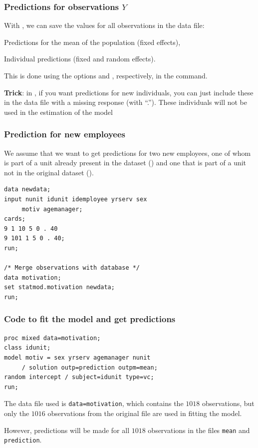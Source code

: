 \documentclass{beamer}
\begin{document}
\begin{frame}[fragile]
\frametitle{Predictions for observations $Y$}
\bi
\item With , we can save the values \alert{for all observations in the data file}:
\bi
\item Predictions for the mean of the population (fixed effects),
\item Individual predictions (fixed and random effects).
\ei
\item This is done using the options 
and , respectively, in the  command.
\item \textbf{Trick}: in \SASlang{}, if you want predictions for new individuals, you can just include these in the data file with a missing response (with ``.''). These individuals will not be used in the estimation of the model
\ei
\end{frame}

\begin{frame}[fragile]
\frametitle{Prediction for new employees}
We assume that we want to get predictions for two new employees, one of whom is part of a unit already present in the dataset () and one that is part of a unit not in the original dataset (). 


\begin{tcolorbox}[colback=white, colframe=hecblue, title=\SASlang{} code to input two new observations]
\begin{small}
\begin{verbatim}
data newdata; 
input nunit idunit idemployee yrserv sex 
     motiv agemanager; 
cards; 
9 1 10 5 0 . 40 
9 101 1 5 0 . 40; 
run; 

/* Merge observations with database */
data motivation; 
set statmod.motivation newdata; 
run;
\end{verbatim}
\end{small}
\end{tcolorbox}
\end{frame}

\begin{frame}[fragile]
\frametitle{Code to fit the model and get predictions}
\begin{tcolorbox}[colback=white, colframe=hecblue, title=\SASlang{} code to output predictions from a mixed model]
\begin{verbatim}
proc mixed data=motivation; 
class idunit; 
model motiv = sex yrserv agemanager nunit 
     / solution outp=prediction outpm=mean; 
random intercept / subject=idunit type=vc; 
run;
\end{verbatim}
\end{tcolorbox}
\bi
\item The data file used is \texttt{data=motivation}, which contains the $1018$ observations, but only the $1016$ observations from the original file are used in fitting the model. 
\item However, predictions will be made for all $1018$ observations in the files \texttt{mean} and \texttt{prediction}.
\ei
\end{frame}
\end{document}
